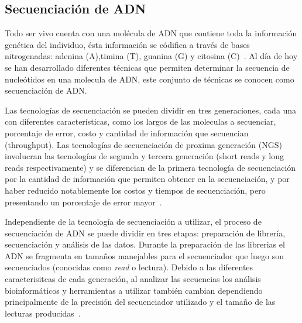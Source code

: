 
\subsection{Secuenciación de ADN}
Todo ser vivo cuenta con una molécula de ADN que contiene toda la información genética del individuo, ésta información se códifica a través de bases nitrogenadas: adenina (A),timina (T), guanina (G) y citosina (C)~\cite{watson1953molecular}. Al día de hoy se han desarrollado diferentes técnicas que permiten determinar la secuencia de nucleótidos en una molecula de ADN, este conjunto de técnicas se conocen como secuenciación de ADN. 

Las tecnologías de secuenciación se pueden dividir en tres generaciones, cada una con diferentes características, como los largos de las moleculas a secuenciar, porcentaje de error, costo y cantidad de información que secuencian (throughput).
Las tecnologías de secuenciación de proxima generación (NGS) involucran las tecnologías de segunda y tercera generación (short reads y long reads respectivamente) y se diferencian de la primera tecnología de secuenciación por la cantidad de información que permiten obtener en la secuenciación, y por haber reducido notablemente los costos y tiempos de secuenciación, pero presentando un porcentaje de error mayor~\cite{kumar2024next}. 

Independiente de la tecnología de secuenciación a utilizar, el proceso de secuenciación de ADN se puede dividir en tres etapas: preparación de librería, secuenciación y análisis de las datos. Durante la preparación de las librerias el ADN se fragmenta en tamaños manejables para el secuenciador que luego son secuenciados (conocidas como \textit{read} o lectura).
Debido a las diferentes caracterisitcas de cada generación, al analizar las secuencias los análisis bioinformáticos y herramientas a utilizar también cambian dependiendo principalmente de la precisión del secuenciador utilizado y el tamaño de las lecturas producidas~\cite{bierman2014understanding}.


